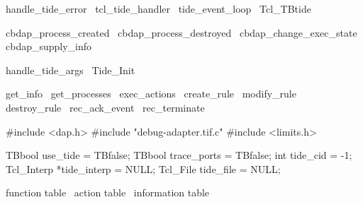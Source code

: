 \LA{}handle_tide_error~{\nwtagstyle{}}\RA{}
\LA{}tcl_tide_handler~{\nwtagstyle{}}\RA{}
\LA{}tide_event_loop~{\nwtagstyle{}}\RA{}
\LA{}Tcl_TBtide~{\nwtagstyle{}}\RA{}

\LA{}cbdap_process_created~{\nwtagstyle{}}\RA{}
\LA{}cbdap_process_destroyed~{\nwtagstyle{}}\RA{}
\LA{}cbdap_change_exec_state~{\nwtagstyle{}}\RA{}
\LA{}cbdap_supply_info~{\nwtagstyle{}}\RA{}

\LA{}handle_tide_args~{\nwtagstyle{}}\RA{}
\LA{}Tide_Init~{\nwtagstyle{}}\RA{}

\LA{}get_info~{\nwtagstyle{}}\RA{}
\LA{}get_processes~{\nwtagstyle{}}\RA{}
\LA{}exec_actions~{\nwtagstyle{}}\RA{}
\LA{}create_rule~{\nwtagstyle{}}\RA{}
\LA{}modify_rule~{\nwtagstyle{}}\RA{}
\LA{}destroy_rule~{\nwtagstyle{}}\RA{}
\LA{}rec_ack_event~{\nwtagstyle{}}\RA{}
\LA{}rec_terminate~{\nwtagstyle{}}\RA{}
\nwendcode{}\nwdocspar


\nwenddocs{}\endmoddef
#include <dap.h>
#include "debug-adapter.tif.c"
#include <limits.h>
\nwendcode{}\nwdocspar


\nwenddocs{}\endmoddef
TBbool use_tide = TBfalse;
TBbool trace_ports = TBfalse;
int tide_cid = -1;
Tcl_Interp *tide_interp = NULL;
Tcl_File tide_file = NULL;

\LA{}function table~{\nwtagstyle{}}\RA{}
\LA{}action table~{\nwtagstyle{}}\RA{}
\LA{}information table~{\nwtagstyle{}}\RA{}
\nwendcode{}\nwdocspar

